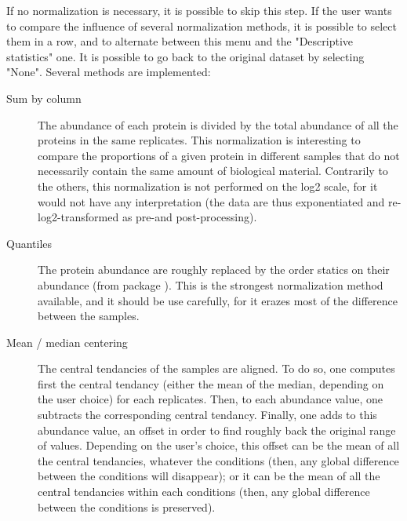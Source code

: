 \documentclass[12pt]{article}
\begin{document}
If no normalization is necessary, it is possible to skip this step.
If the user wants to compare the influence of several normalization methods, 
it is possible to select them in a row, and to alternate between this menu 
and the "Descriptive statistics" one. It is possible to go back to the 
original dataset by selecting "None".
Several methods are implemented:
\begin {description}
    \item[Sum by column] The abundance of each protein is divided by the 
    total abundance of all the proteins in the same replicates. This 
    normalization is interesting to compare the proportions of a given 
    protein in different samples that do not necessarily contain the same 
    amount of biological material. Contrarily to the others, this 
    normalization is not performed on the log2 scale, for it would not have 
    any interpretation (the data are thus exponentiated and 
    re-log2-transformed as pre-and post-processing).
    \item[Quantiles] The protein abundance are roughly replaced by the order 
    statics on their abundance (from package ). This 
    is the strongest normalization method available, and it should be use 
    carefully, for it erazes most of the difference between the samples.
    \item[Mean / median centering] The central tendancies of the samples 
    are aligned. To do so, one computes first the central tendancy (either 
    the mean of the median, depending on the user choice) for each replicates.
    Then, to each abundance value, one subtracts the corresponding central 
    tendancy. Finally, one adds to this abundance value, an offset in order 
    to find roughly back the original range of values. Depending on the 
    user's choice, this offset can be the mean of all the central tendancies, 
    whatever the conditions (then, any global difference between the 
    conditions will disappear);  or it can be the mean of all the central 
    tendancies within each conditions (then, any global difference between 
    the conditions is preserved).

\end{description}
\end{document}
